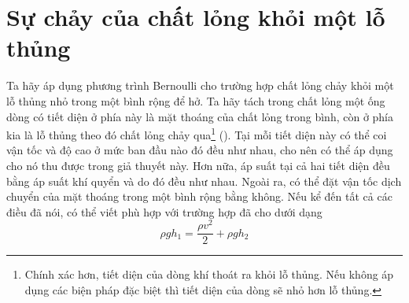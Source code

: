 
\section{Sự chảy của chất lỏng khỏi một lỗ thủng}\label{sec:9_3}


Ta hãy áp dụng phương trình Bernoulli cho trường hợp chất lỏng chảy khỏi một lỗ thủng nhỏ trong một bình rộng để hở. Ta hãy tách trong chất lỏng một ống dòng có tiết diện ở phía này là mặt thoáng của chất lỏng trong bình, còn ở phía kia là lỗ thủng theo đó chất lỏng chảy qua\footnote{Chính xác hơn, tiết diện của dòng khí thoát ra khỏi lỗ thủng. Nếu không áp dụng các biện pháp đặc biệt thì tiết diện của dòng sẽ nhỏ hơn lỗ thủng.} (). Tại mỗi tiết diện này có thể coi vận tốc và độ cao ở mức ban đầu nào đó đều như nhau, cho nên có thể áp dụng cho nó  thu được trong giả thuyết này. Hơn nữa, áp suất tại cả hai tiết diện đều bằng áp suất khí quyển và do đó đều như nhau. Ngoài ra, có thể đặt vận tốc dịch chuyển của mặt thoáng trong một bình rộng bằng không. Nếu kể đến tất cả các điều đã nói, có thể viết  phù hợp với trường hợp đã cho dưới dạng
\begin{equation*}
	\rho gh_1 = \frac{\rho v^2}{2} + \rho gh_2
\end{equation*}

\noindent

